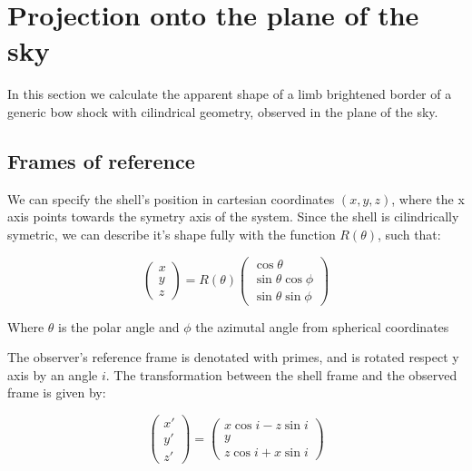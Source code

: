 \section{Projection onto the plane of the sky}
\label{sec:projection}

In this section we calculate the apparent shape of a limb brightened  border of a generic bow shock with cilindrical geometry, observed in the
plane of the sky.

\subsection{Frames of reference}

We can specify the shell's position in cartesian coordinates $(x,y,z)$, where the x axis points towards the symetry axis of the system.
Since the shell is cilindrically symetric, we can describe it's shape fully with the function $R(\theta)$, such that:

\begin{equation}
\left(\begin{array}{c}
x \\ y \\ z
\end{array}
\right) = R(\theta)\left(\begin{array}{c}
\cos\theta \\
\sin\theta\cos\phi \\
\sin\theta\sin\phi
\end{array}\right)
\end{equation} 

Where $\theta$ is the polar angle and $\phi$ the azimutal angle from spherical coordinates

The observer's reference frame is denotated with primes, and is rotated respect y axis by an angle $i$. The transformation between the shell frame and the observed
frame is given by:

\begin{equation}
\left(\begin{array}{c}
x' \\ y' \\ z'
\end{array}
\right) = \left(\begin{array}{c}
x\cos i - z\sin i\\
y \\
z\cos i + x\sin i
\end{array}\right)
\label{eq:Trans}
\end{equation} 

